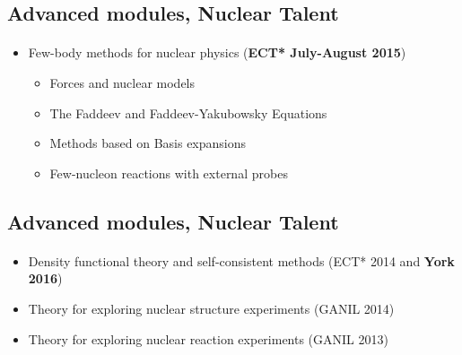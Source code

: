 \documentclass[%
twoside,                 %
final,                   %
10pt]{article}
\begin{document}
\noindent





\subsection*{Advanced  modules, Nuclear Talent}

\paragraph{}
\begin{itemize}
\item Few-body methods for nuclear physics (\textbf{ECT* July-August 2015})
\begin{itemize}

 \item Forces and nuclear models

 \item The Faddeev and Faddeev-Yakubowsky Equations

 \item Methods based on Basis expansions

 \item Few-nucleon reactions with external probes
\end{itemize}

\noindent
\end{itemize}

\noindent




\subsection*{Advanced  modules, Nuclear Talent}

\paragraph{}
\begin{itemize}
\item Density functional theory and self-consistent methods (ECT* 2014 and \textbf{York 2016})

\item Theory for exploring nuclear structure experiments (GANIL 2014)

\item Theory for exploring nuclear reaction experiments (GANIL 2013)
\end{itemize}
\end{document}
